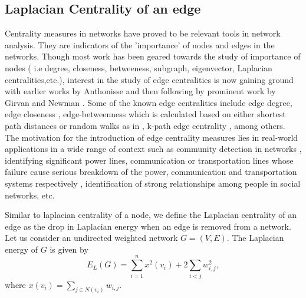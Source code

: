 \documentclass[10pt,a4paper]{article}
\begin{document}
\subsection{Laplacian Centrality of an edge}

	Centrality measures in networks have proved to be relevant tools in network analysis. They are indicators of the 'importance' of nodes and edges in the networks. Though most work has been geared towards the study of importance of nodes ( i.e degree, closeness, betweeness, subgraph, eigenvector, Laplacian centralities,etc.), interest in the study of edge centralities is now gaining ground with earlier works by  Anthonisse \citep{anthonisse1971rush} and then following by prominent work by Girvan and Newman \citep{newman2004finding}. Some of the known edge centralities include edge degree, edge closeness \citep{ortiz2016centrality}, edge-betweenness which is calculated based on either shortest path distances or random walks as in \citep{newman2004finding}, k-path edge centrality \cite{alahakoon2011k}, among others. The motivation for the introduction of edge centrality measures lies in real-world applications in a wide range of context such as community detection in networks \citep{newman2004finding}, identifying significant power lines, communication or transportation lines whose failure cause serious breakdown of the  power, communication and transportation systems respectively \citep{ortiz2016centrality}, identification of strong relationships among people in social networks, etc. 

Similar to laplacian centrality of a node, we define the Laplacian centrality of an edge as the drop in Laplacian energy when an edge is removed from a network.
Let us consider an undirected weighted network $G=(V,E)$. The Laplacian energy of $G$ is given by
\begin{equation}
E_L(G) = \sum_{i=1}^n x^2(v_i) + 2 \sum_{i<j} w^2_{i,j},
\label{edgelapG}
\end{equation} 	 
where $x(v_i) = \sum_{j\in N(v_i)} w_{i,j}$.
\end{document}
